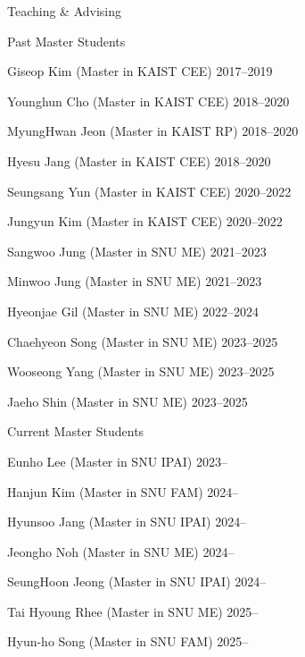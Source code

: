 \begin{rSection}{Teaching \& Advising}
\begin{rSubsection}{Past Master Students}{}{}{}
  \item Giseop Kim (Master in KAIST \ac{CEE}) \hfill 2017--2019
  \item Younghun Cho (Master in KAIST \ac{CEE}) \hfill 2018--2020
  \item MyungHwan Jeon (Master in KAIST \ac{RP}) \hfill 2018--2020
  \item Hyesu Jang (Master in KAIST \ac{CEE}) \hfill 2018--2020
  \item Seungsang Yun (Master in KAIST \ac{CEE}) \hfill 2020--2022
  \item Jungyun Kim (Master in KAIST \ac{CEE}) \hfill 2020--2022
  \item Sangwoo Jung (Master in SNU \ac{ME}) \hfill 2021--2023
  \item Minwoo Jung (Master in SNU \ac{ME}) \hfill 2021--2023
  \item Hyeonjae Gil (Master in SNU \ac{ME}) \hfill 2022--2024
  \item Chaehyeon Song (Master in SNU \ac{ME}) \hfill 2023--2025
  \item Wooseong Yang (Master in SNU \ac{ME}) \hfill 2023--2025
  \item Jaeho Shin (Master in SNU \ac{ME}) \hfill 2023--2025
\end{rSubsection}

\begin{rSubsection}{Current Master Students}{}{}{}
  \item Eunho Lee (Master in SNU \ac{IPAI}) \hfill 2023--
  \item Hanjun Kim (Master in SNU \ac{FAM}) \hfill 2024--
  \item Hyunsoo Jang (Master in SNU \ac{IPAI}) \hfill 2024--
  \item Jeongho Noh (Master in SNU \ac{ME}) \hfill 2024--
  \item SeungHoon Jeong (Master in SNU \ac{IPAI}) \hfill 2024--
  \item Tai Hyoung Rhee (Master in SNU \ac{ME}) \hfill 2025--
  \item Hyun-ho Song (Master in SNU \ac{FAM}) \hfill 2025--
\end{rSubsection}



\end{rSection}
